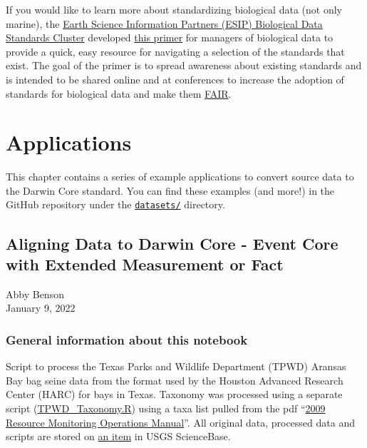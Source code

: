 \documentclass[
]{book}
\begin{document}
If you would like to learn more about standardizing biological data (not only marine), the
\href{https://wiki.esipfed.org/Biological_Data_Standards_Cluster}{Earth Science Information Partners (ESIP) Biological Data Standards Cluster} developed
\href{https://doi.org/10.6084/m9.figshare.16806712.v1}{this primer} for managers of biological data to provide a quick, easy
resource for navigating a selection of the standards that exist. The goal of the primer is to spread awareness about
existing standards and is intended to be shared online and at conferences to increase the adoption of standards for
biological data and make them \href{https://www.go-fair.org/fair-principles/}{FAIR}.

\hypertarget{applications}{%
\chapter{Applications}\label{applications}}

This chapter contains a series of example applications to convert source data to the Darwin Core standard. You can find
these examples (and more!) in the GitHub repository under the \href{https://github.com/ioos/bio_data_guide/tree/main/datasets}{\texttt{datasets/}}
directory.

\hypertarget{aligning-data-to-darwin-core---event-core-with-extended-measurement-or-fact}{%
\section{Aligning Data to Darwin Core - Event Core with Extended Measurement or Fact}\label{aligning-data-to-darwin-core---event-core-with-extended-measurement-or-fact}}

Abby Benson\\
January 9, 2022

\hypertarget{general-information-about-this-notebook}{%
\subsection{General information about this notebook}\label{general-information-about-this-notebook}}

Script to process the Texas Parks and Wildlife Department (TPWD) Aransas Bay bag seine data from
the format used by the Houston Advanced Research Center (HARC) for bays in Texas. Taxonomy was processed using a separate script (\href{https://www.sciencebase.gov/catalog/file/get/53a887f4e4b075096c60cfdd?f=__disk__ab\%2F6e\%2Ff8\%2Fab6ef8426ea328cb6c54d13ee7b6b7ce791d23f8}{TPWD\_Taxonomy.R}) using a taxa list pulled from the pdf ``\href{https://www.sciencebase.gov/catalog/file/get/53a887f4e4b075096c60cfdd?f=__disk__d9\%2Ff6\%2F46\%2Fd9f646b40cf7c6cc3fa77d1e7aebe88f46cf7145}{2009 Resource Monitoring Operations Manual}''. All original data, processed data and scripts are stored on \href{https://www.sciencebase.gov/catalog/item/53a887f4e4b075096c60cfdd}{an item} in USGS ScienceBase.
\end{document}
